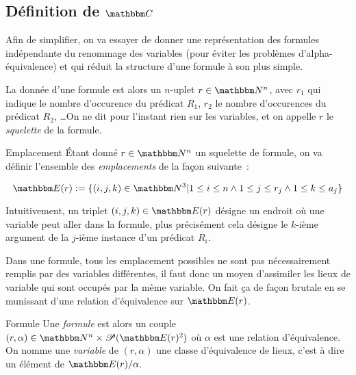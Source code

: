 

\subsection{Définition de $\C$}

Afin de simplifier, on va essayer de donner une représentation des formules indépendante
du renommage des variables (pour éviter les problèmes d'alpha-équivalence) et qui réduit
la structure d'une formule à son plus simple.

La donnée d'une formule est alors un $n$-uplet $r\in\N^n$, avec $r_1$ qui indique le
nombre d'occurence du prédicat $R_1$, $r_2$ le nombre d'occurences du prédicat $R_2$,
\dots On ne dit pour l'instant rien sur les variables, et on appelle $r$ le 
\emph{squelette} de la formule.

\begin{defi}{Emplacement}
    Étant donné $r\in\N^n$ un squelette de formule, on va définir l'ensemble des
    \emph{emplacements} de la façon suivante~:

    \[ \E(r):= \{(i,j,k)\in\N^3 |        1\leq i\leq n
                                  \wedge 1\leq j\leq r_j
                                  \wedge 1\leq k\leq a_j\} \]

    Intuitivement, un triplet $(i,j,k)\in\E(r)$ désigne un endroit où une variable peut
    aller dans la formule, plus précisément cela désigne le $k$-ième argument de la
    $j$-ième instance d'un prédicat $R_i$.
\end{defi}

Dans une formule, tous les emplacement possibles ne sont pas nécessairement remplis
par des variables différentes, il faut donc un moyen d'assimiler les lieux de variable
qui sont occupés par la même variable. On fait ça de façon brutale en se munissant d'une
relation d'équivalence sur $\E(r)$.

\begin{defi}{Formule}
    Une \emph{formule} est alors un couple $(r,\alpha)\in\N^n\times\P(\E(r)^2)$
    où $\alpha$ est une relation d'équivalence. On nomme une \emph{variable} de
    $(r,\alpha)$ une classe d'équivalence de lieux, c'est à dire un élément de
    $\E(r)/\alpha$.
\end{defi}

